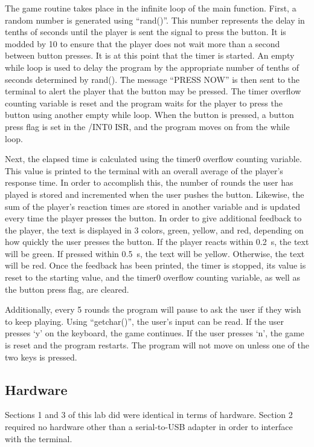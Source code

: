 \documentclass[12pt]{article}
\begin{document}
The game routine takes place in the infinite loop of the main function. First, a random number is generated using ``rand()''. This number represents the delay in tenths of seconds until the player is sent the signal to press the button. It is modded by 10 to ensure that the player does not wait more than a second between button presses. It is at this point that the timer is started. An empty while loop is used to delay the program by the appropriate number of tenths of seconds determined by rand(). The message ``PRESS NOW'' is then sent to the terminal to alert the player that the button may be pressed. The timer overflow counting variable is reset and the program waits for the player to press the button using another empty while loop. When the button is pressed, a button press flag is set in the /INT0 ISR, and the program moves on from the while loop. 

Next, the elapsed time is calculated using the timer0 overflow counting variable. This value is printed to the terminal with an overall average of the player's response time. In order to accomplish this, the number of rounds the user has played is stored and incremented when the user pushes the button. Likewise, the sum of the player's reaction times are stored in another variable and is updated every time the player presses the button. In order to give additional feedback to the player, the text is displayed in 3 colors, green, yellow, and red, depending on how quickly the user presses the button. If the player reacts within \SI{0.2}{s}, the text will be green. If pressed within \SI{0.5}{s}, the text will be yellow. Otherwise, the text will be red. Once the feedback has been printed, the timer is stopped, its value is reset to the starting value, and the timer0 overflow counting variable, as well as the button press flag, are cleared.

Additionally, every 5 rounds the program will pause to ask the user if they wish to keep playing. Using ``getchar()'', the user's input can be read. If the user presses `y' on the keyboard, the game continues. If the user presses `n', the game is reset and the program restarts. The program will not move on unless one of the two keys is pressed.

\subsection{Hardware}

Sections 1 and 3 of this lab did were identical in terms of hardware. Section 2 required no hardware other than a serial-to-USB adapter in order to interface with the terminal.
\end{document}
